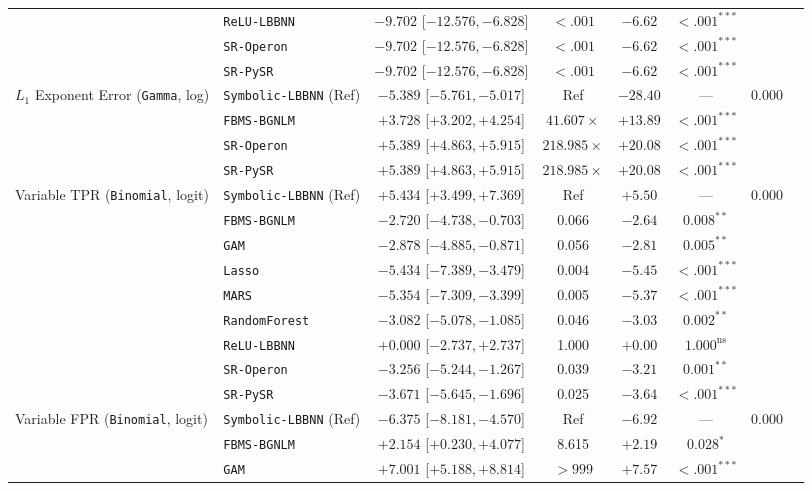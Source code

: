 \begin{table}[htbp]
{{\begin{tabular}{llcccccc}
 & \texttt{ReLU-LBBNN} & $-9.702$ [$-12.576, -6.828$] & $<.001$ & $-6.62$ & $<.001^{***}$ &  \\
 & \texttt{SR-Operon} & $-9.702$ [$-12.576, -6.828$] & $<.001$ & $-6.62$ & $<.001^{***}$ &  \\
 & \texttt{SR-PySR} & $-9.702$ [$-12.576, -6.828$] & $<.001$ & $-6.62$ & $<.001^{***}$ &  \\
\midrule
$L_1$ Exponent Error (\texttt{Gamma}, log) & \texttt{Symbolic-LBBNN} (Ref) & $-5.389$ [$-5.761, -5.017$] & Ref & $-28.40$ & --- & 0.000 \\
 & \texttt{FBMS-BGNLM} & $+3.728$ [$+3.202, +4.254$] & $41.607\times$ & $+13.89$ & $<.001^{***}$ &  \\
 & \texttt{SR-Operon} & $+5.389$ [$+4.863, +5.915$] & $218.985\times$ & $+20.08$ & $<.001^{***}$ &  \\
 & \texttt{SR-PySR} & $+5.389$ [$+4.863, +5.915$] & $218.985\times$ & $+20.08$ & $<.001^{***}$ &  \\
\midrule
Variable TPR (\texttt{Binomial}, logit) & \texttt{Symbolic-LBBNN} (Ref) & $+5.434$ [$+3.499, +7.369$] & Ref & $+5.50$ & --- & 0.000 \\
 & \texttt{FBMS-BGNLM} & $-2.720$ [$-4.738, -0.703$] & 0.066 & $-2.64$ & $0.008^{**}$ &  \\
 & \texttt{GAM} & $-2.878$ [$-4.885, -0.871$] & 0.056 & $-2.81$ & $0.005^{**}$ &  \\
 & \texttt{Lasso} & $-5.434$ [$-7.389, -3.479$] & 0.004 & $-5.45$ & $<.001^{***}$ &  \\
 & \texttt{MARS} & $-5.354$ [$-7.309, -3.399$] & 0.005 & $-5.37$ & $<.001^{***}$ &  \\
 & \texttt{RandomForest} & $-3.082$ [$-5.078, -1.085$] & 0.046 & $-3.03$ & $0.002^{**}$ &  \\
 & \texttt{ReLU-LBBNN} & $+0.000$ [$-2.737, +2.737$] & 1.000 & $+0.00$ & $1.000^{\text{ns}}$ &  \\
 & \texttt{SR-Operon} & $-3.256$ [$-5.244, -1.267$] & 0.039 & $-3.21$ & $0.001^{**}$ &  \\
 & \texttt{SR-PySR} & $-3.671$ [$-5.645, -1.696$] & 0.025 & $-3.64$ & $<.001^{***}$ &  \\
\midrule
Variable FPR (\texttt{Binomial}, logit) & \texttt{Symbolic-LBBNN} (Ref) & $-6.375$ [$-8.181, -4.570$] & Ref & $-6.92$ & --- & 0.000 \\
 & \texttt{FBMS-BGNLM} & $+2.154$ [$+0.230, +4.077$] & 8.615 & $+2.19$ & $0.028^{*}$ &  \\
 & \texttt{GAM} & $+7.001$ [$+5.188, +8.814$] & $>999$ & $+7.57$ & $<.001^{***}$ &  \\

\end{tabular}}}
\end{table}
